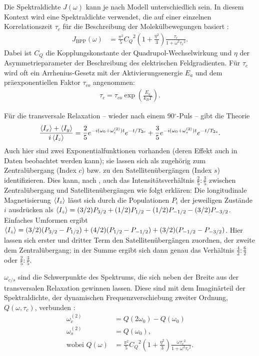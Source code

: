 Die Spektraldichte $J(\omega)$ kann je nach Modell unterschiedlich sein. In diesem Kontext wird eine Spektraldichte verwendet, die auf einer einzelnen Korrelationszeit $\tau_c$ für die Beschreibung der Molekülbewegungen basiert \cite{eckert}:
\begin{align}
    J_\text{BPP}(\omega) &= \frac{\pi^2}{5} {C_Q}^2 \left( 1 + \frac{\eta^2}{3} \right) \frac{\tau_c}{1 + \omega^2 {\tau_c}^2}. \label{eqn:spektraldichte_j}
\end{align}
Dabei ist $C_Q$ die Kopplungskonstante der Quadrupol-Wechselwirkung und $\eta$ der Asymmetrieparameter der Beschreibung des elektrischen Feldgradienten. Für $\tau_c$ wird oft ein Arrhenius-Gesetz mit der Aktivierungsenergie $E_a$ und dem präexponentiellen Faktor $\tau_{co}$ angenommen:
\begin{align}
    \tau_c = \tau_{co} \exp \left( \frac{E_a}{k_B T} \right).
\end{align}


Für die transversale Relaxation -- wieder nach einem 90$^\circ$-Puls -- gibt die Theorie \cite{werbelow}
\begin{align}
    \frac{\Braket{I_x} + \Braket{I_y}}{i\Braket{I_z}} = \frac{2}{5}e^{-i(\omega_0 + \omega_c^{(2)})t}e^{-t/T_{2c}} + \frac{3}{5}e^{-i(\omega_0 + \omega_s^{(2)})t}e^{-t/T_{2s}}. \label{eqn:trans_relax}
\end{align}
Auch hier sind zwei Exponentialfunktionen vorhanden (deren Effekt auch in Daten beobachtet werden kann); sie lassen sich als zugehörig zum Zentralübergang (Index $c$) bzw. zu den Satellitenübergängen (Index $s$) identifizieren. Dies kann, nach \cite{werbelow}, auch das Intensitätsverhältnis $\frac{2}{5}:\frac{3}{5}$ zwischen Zentralübergang und Satellitenübergängen wie folgt erklären: Die longitudinale Magnetisierung $\Braket{I_z}$ lässt sich durch die Populationen $P_i$ der jeweiligen Zustände $i$ ausdrücken als $\Braket{I_z} = (3/2)P_{3/2} + (1/2)P_{1/2} - (1/2)P_{-1/2} - (3/2)P_{-3/2}$. Einfaches Umformen ergibt $\Braket{I_z} = (3/2)(P_{3/2} - P_{1/2}) + (4/2)(P_{1/2} - P_{-1/2}) + (3/2)(P_{-1/2} - P_{-3/2})$. Hier lassen sich erster und dritter Term den Satellitenübergängen zuordnen, der zweite dem Zentralübergang; in der Summe ergibt sich dann genau das Verhältnis $\frac{4}{2}:\frac{6}{2}$ oder $\frac{2}{5}:\frac{3}{5}$.

$\omega_{c/s}$ sind die Schwerpunkte des Spektrums, die sich neben der Breite aus der transversalen Relaxation gewinnen lassen. Diese sind mit dem Imaginärteil der Spektraldichte, der dynamischen Frequenzverschiebung zweiter Ordnung, $Q(\omega, \tau_c)$, verbunden \cite{eckert}:
\begin{align}
    \omega_c^{(2)} &= Q(2\omega_0) - Q(\omega_0) \\ \label{eqn:schwerpunkt}
    \omega_s^{(2)} &= Q(\omega_0), \\
    \text{wobei } Q(\omega) &= \frac{\pi^2}{5} {C_Q}^2 \left( 1 + \frac{\eta^2}{3} \right) \frac{\omega {\tau_c}^2}{1 + \omega^2 {\tau_c}^2}.
\end{align}

